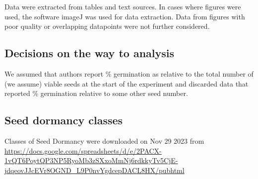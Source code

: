 \documentclass{article}
\begin{document}
Data were extracted from tables and text sources. In cases where figures were used, the software imageJ  was used for data extraction. Data from figures with poor quality or overlapping datapoints were not further considered.

\subsection*{Decisions on the way to analysis} 

We assumed that authors report \% germination as relative to the total number of (we assume) viable seeds at the start of the experiment and discarded data that reported \% germination relative to some other seed number. %

\subsection*{Seed dormancy classes} 

Classes of Seed Dormancy were downloaded on Nov 29 2023 from \url{https://docs.google.com/spreadsheets/d/e/2PACX-1vQT6PoytQP3NP5RyoMb3zSXxoMmNj6rdkkyTv5CjE-jdqeovJJcEVr8OGND_L9P0nvYgdcepDACL8HX/pubhtml}




%
\end{document}
